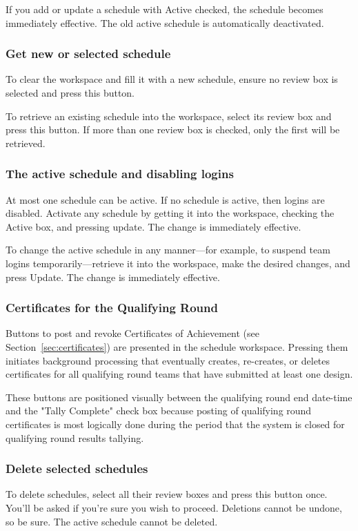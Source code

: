 \documentclass[11pt,letterpaper]{refart}
\def\ui#1{\textsf{#1}}
\begin{document}
If you add or update a schedule with \ui{Active} checked, the schedule becomes
immediately effective. The old active schedule is automatically deactivated.

\subsubsection{Get new or selected schedule}
To clear the workspace and fill it with a new schedule, ensure no 
review box is selected and press this button.

To retrieve an existing schedule into the workspace, select 
its review box and press this button. If more than one review box is
checked, only the first will be retrieved. 

\subsubsection{The active schedule and disabling logins}
At most one schedule can be active. If no schedule is active, then logins are disabled.
Activate any schedule by getting it into the workspace, checking the \ui{Active} box,
and pressing \ui{update}. The change is immediately effective.

To change the active schedule in any manner---for example, to suspend team logins
temporarily---retrieve it into the workspace, make the desired changes, and press
\ui{Update}. The change is immediately effective.

\subsubsection{Certificates for the Qualifying Round}
Buttons to post and revoke Certificates of Achievement (see 
Section~\ref{sec:certificates}) are presented in the schedule
workspace. Pressing them initiates background processing 
that eventually creates, re-creates, or deletes certificates for all qualifying
round teams that have submitted at least one design.

These buttons are positioned visually between the qualifying round end
date-time and the "Tally Complete" check box because posting
of qualifying round certificates is most logically done during the
period that the system is closed for qualifying round results 
tallying.

\subsubsection{Delete selected schedules}
To delete schedules, select all their review boxes and press this button
once. You'll be asked if you're sure you wish to proceed. Deletions cannot
be undone, so be sure. The active schedule cannot be deleted.
\end{document}
